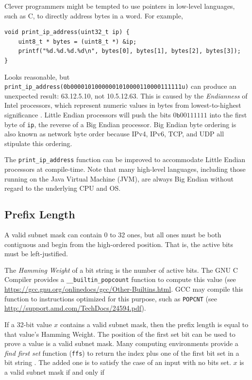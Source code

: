 \documentclass{book}
\begin{document}
Clever programmers might be tempted to use pointers in low-level languages, such as C, to directly address bytes in a word. For example,

\begin{lstlisting}
void print_ip_address(uint32_t ip) {
    uint8_t * bytes = (uint8_t *) &ip;
    printf("%d.%d.%d.%d\n", bytes[0], bytes[1], bytes[2], bytes[3]);
}
\end{lstlisting}

Looks reasonable, but \texttt{print\_ip\_address(0b00001010000001010000110000111111u)} can produce an unexpected result: 63.12.5.10, not 10.5.12.63. This is caused by the \textit{Endianness} of Intel processors, which represent numeric values in bytes from lowest-to-highest significance \cite{verts}. Little Endian processors will push the bits $0\texttt{b}00111111$ into the first byte of \texttt{ip}, the reverse of a Big Endian processor. Big Endian byte ordering is also known as network byte order because IPv4, IPv6, TCP, and UDP all stipulate this ordering.

The \texttt{print\_ip\_address} function can be improved to accommodate Little Endian processors at compile-time. Note that many high-level languages, including those running on the Java Virtual Machine (JVM), are always Big Endian without regard to the underlying CPU and OS.

\subsection{Prefix Length}

A valid subnet mask can contain 0 to 32 ones, but all ones must be both contiguous and begin from the high-ordered position. That is, the active bits must be left-justified.

The \textit{Hamming Weight} of a bit string is the number of active bits. The GNU C Compiler provides a \texttt{\_\_builtin\_popcount} function to compute this value (see \url{https://gcc.gnu.org/onlinedocs/gcc/Other-Builtins.html}. GCC may compile this function to instructions optimized for this purpose, such as \texttt{POPCNT} (see \url{http://support.amd.com/TechDocs/24594.pdf}). 

If a 32-bit value $x$ contains a valid subnet mask, then the prefix length is equal to that value's Hamming Weight. The position of the first set bit can be used to prove a value is a valid subnet mask. Many computing environments provide a \textit{find first set} function (\texttt{ffs}) to return the index plus one of the first bit set in a bit string \cite{ffs_manpage}. The added one is to satisfy the case of an input with no bits set. $x$ is a valid subnet mask if and only if 
\end{document}
